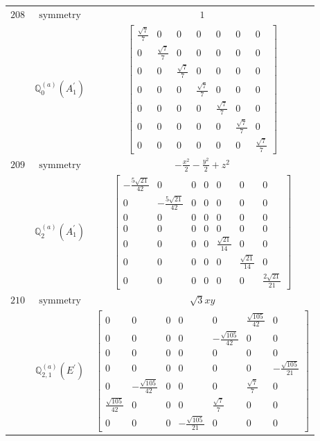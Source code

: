 \documentclass[fleqn,8pt,landscape]{jsarticle}
\begin{document}
\begin{longtable}{ccc}
$ 208 $ & $ \text{symmetry} $ & $ 1 $ \\
$  $ & $ \mathbb{Q}_{0}^{(a)}(A_{1}^{\prime}) $ & $ \begin{bmatrix} \frac{\sqrt{7}}{7} & 0 & 0 & 0 & 0 & 0 & 0 \\ 0 & \frac{\sqrt{7}}{7} & 0 & 0 & 0 & 0 & 0 \\ 0 & 0 & \frac{\sqrt{7}}{7} & 0 & 0 & 0 & 0 \\ 0 & 0 & 0 & \frac{\sqrt{7}}{7} & 0 & 0 & 0 \\ 0 & 0 & 0 & 0 & \frac{\sqrt{7}}{7} & 0 & 0 \\ 0 & 0 & 0 & 0 & 0 & \frac{\sqrt{7}}{7} & 0 \\ 0 & 0 & 0 & 0 & 0 & 0 & \frac{\sqrt{7}}{7} \end{bmatrix} $ \\ \hline
$ 209 $ & $ \text{symmetry} $ & $ - \frac{x^{2}}{2} - \frac{y^{2}}{2} + z^{2} $ \\
$  $ & $ \mathbb{Q}_{2}^{(a)}(A_{1}^{\prime}) $ & $ \begin{bmatrix} - \frac{5 \sqrt{21}}{42} & 0 & 0 & 0 & 0 & 0 & 0 \\ 0 & - \frac{5 \sqrt{21}}{42} & 0 & 0 & 0 & 0 & 0 \\ 0 & 0 & 0 & 0 & 0 & 0 & 0 \\ 0 & 0 & 0 & 0 & 0 & 0 & 0 \\ 0 & 0 & 0 & 0 & \frac{\sqrt{21}}{14} & 0 & 0 \\ 0 & 0 & 0 & 0 & 0 & \frac{\sqrt{21}}{14} & 0 \\ 0 & 0 & 0 & 0 & 0 & 0 & \frac{2 \sqrt{21}}{21} \end{bmatrix} $ \\ \hline
$ 210 $ & $ \text{symmetry} $ & $ \sqrt{3} x y $ \\
$  $ & $ \mathbb{Q}_{2,1}^{(a)}(E^{\prime}) $ & $ \begin{bmatrix} 0 & 0 & 0 & 0 & 0 & \frac{\sqrt{105}}{42} & 0 \\ 0 & 0 & 0 & 0 & - \frac{\sqrt{105}}{42} & 0 & 0 \\ 0 & 0 & 0 & 0 & 0 & 0 & 0 \\ 0 & 0 & 0 & 0 & 0 & 0 & - \frac{\sqrt{105}}{21} \\ 0 & - \frac{\sqrt{105}}{42} & 0 & 0 & 0 & \frac{\sqrt{7}}{7} & 0 \\ \frac{\sqrt{105}}{42} & 0 & 0 & 0 & \frac{\sqrt{7}}{7} & 0 & 0 \\ 0 & 0 & 0 & - \frac{\sqrt{105}}{21} & 0 & 0 & 0 \end{bmatrix} $ \\ \hline

\end{longtable}
\end{document}
